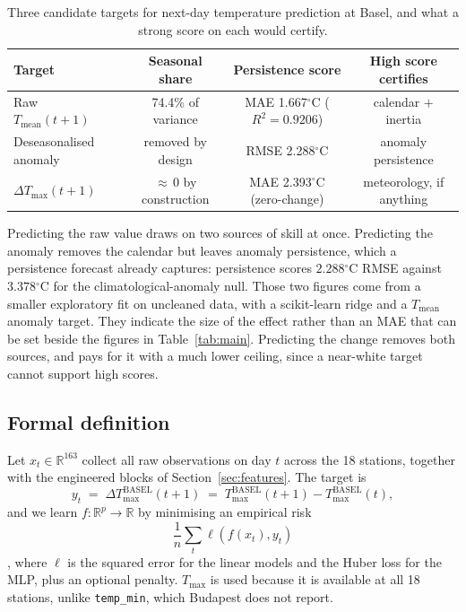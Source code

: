 \documentclass[11pt,a4paper]{article}
\newcommand{\dmax}{\Delta T_{\max}}
\newcommand{\tc}{\ensuremath{^{\circ}\mathrm{C}}}
\begin{document}
\begin{table}[htbp]
\centering
\caption{Three candidate targets for next-day temperature prediction at Basel, and what a strong score on each would certify.}
\label{tab:targets}
\footnotesize
\begin{tabular}{@{}lccc@{}}
\toprule
Target & Seasonal share & Persistence score & High score certifies \\
\midrule
Raw $T_{\text{mean}}(t{+}1)$ & 74.4\% of variance & MAE 1.667\tc{} ($R^2=0.9206$) & calendar $+$ inertia \\
Deseasonalised anomaly & removed by design & RMSE 2.288\tc & anomaly persistence \\
$\dmax(t{+}1)$ & ${\approx}\,0$ by construction & MAE 2.393\tc{} (zero-change) & meteorology, if anything \\
\bottomrule
\end{tabular}
\end{table}

Predicting the raw value draws on two sources of skill at once. Predicting the anomaly removes the calendar but leaves anomaly persistence, which a persistence forecast already captures: persistence scores $2.288\tc$ RMSE against $3.378\tc$ for the climatological-anomaly null. Those two figures come from a smaller exploratory fit on uncleaned data, with a scikit-learn ridge and a $T_{\text{mean}}$ anomaly target. They indicate the size of the effect rather than an MAE that can be set beside the figures in Table~\ref{tab:main}. Predicting the change removes both sources, and pays for it with a much lower ceiling, since a near-white target cannot support high scores.

\subsection{Formal definition}
\label{sec:definition}

Let $x_t \in \mathbb{R}^{163}$ collect all raw observations on day $t$ across the 18 stations, together with the engineered blocks of Section~\ref{sec:features}. The target is
\begin{equation}
y_t \;=\; \dmax^{\text{BASEL}}(t{+}1) \;=\; T^{\text{BASEL}}_{\max}(t{+}1) - T^{\text{BASEL}}_{\max}(t),
\label{eq:target}
\end{equation}
and we learn $f: \mathbb{R}^{p} \to \mathbb{R}$ by minimising an empirical risk $$\frac{1}{n}\sum_t \ell\!\left(f(x_t), y_t\right)$$, where $\ell$ is the squared error for the linear models and the Huber loss for the MLP, plus an optional penalty. $T_{\max}$ is used because it is available at all 18 stations, unlike \texttt{temp\_min}, which Budapest does not report.
\end{document}
